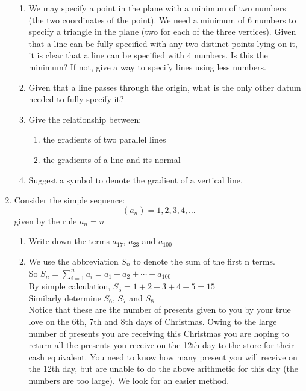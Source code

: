 \documentclass{article}
\begin{document}
\begin{enumerate}
\begin{enumerate}
			\item We may specify a point in the plane with a minimum of two numbers (the two coordinates of the point).  We need a minimum of 6 numbers to specify a triangle in the plane (two for each of the three vertices).  Given that a line can be fully specified with any two distinct points lying on it, it is clear that a line can be specified with 4 numbers.  Is this the minimum?  If not, give a way to specify lines using less numbers.
			
			\item Given that a line passes through the origin, what is the only other datum needed to fully specify it?
			
			\item Give the relationship between:
				\begin{enumerate}
					\item the gradients of two parallel lines
					
					\item the gradients of a line and its normal
				\end{enumerate}
			
			\item Suggest a symbol to denote the gradient of a vertical line.
		\end{enumerate}


	
	
	\item Consider the simple sequence:
			$$ (a_n) = 1, 2, 3, 4, \ldots$$
			given by the rule $a_n = n$
	\begin{enumerate}
	
		\item Write down the terms $a_{17}$, $a_{23}$ and $a_{100}$
		
		\item We use the abbreviation $S_n$ to denote the sum of the first n terms. \\
				So $S_n = \sum_{i=1}^n{a_i} = a_1 + a_2 + \cdots + a_{100}$ \\
				By simple calculation, $S_5 = 1 + 2 + 3 + 4 + 5 = 15$ \\
				Similarly determine $S_6$, $S_7$ and $S_8$ \\
				Notice that these are the number of presents given to you by your true love on the 6th, 7th and 8th days of Christmas.  Owing to the large number of presents you are receiving this Christmas you are hoping to return all the presents you receive on the 12th day to the store for their cash equivalent.  You need to know how many present you will receive on the 12th day, but are unable to do the above arithmetic for this day (the numbers are too large).  We look for an easier method.
				

\end{enumerate}
\end{enumerate}
\end{document}
